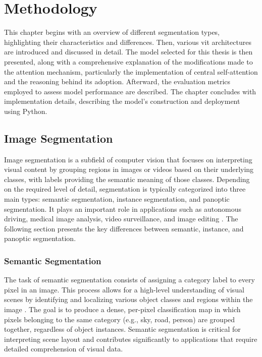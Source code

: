 \chapter{Methodology}
This chapter begins with an overview of different segmentation types, highlighting their characteristics and differences. Then, various \acrfull{vit} architectures are introduced and discussed in detail. The model selected for this thesis is then presented, along with a comprehensive explanation of the modifications made to the attention mechanism, particularly the implementation of central self-attention and the reasoning behind its adoption. Afterward, the evaluation metrics employed to assess model performance are described. The chapter concludes with implementation details, describing the model's construction and deployment using Python.


\section{Image Segmentation}
Image segmentation is a subfield of computer vision that focuses on interpreting visual content by grouping regions in images or videos based on their underlying classes, with labels providing the semantic meaning of those classes. Depending on the required level of detail, segmentation is typically categorized into three main types: semantic segmentation, instance segmentation, and panoptic segmentation. It plays an important role in applications such as autonomous driving, medical image analysis, video surveillance, and image editing \cite{zhou2024imagesegmentationfoundationmodel}. The following section presents the key differences between semantic, instance, and panoptic segmentation.


\subsection{Semantic Segmentation}
The task of semantic segmentation consists of assigning a category label to every pixel in an image. This process allows for a high-level understanding of visual scenes by identifying and localizing various object classes and regions within the image \cite{zhou2018semanticunderstandingscenesade20k}. The goal is to produce a dense, per-pixel classification map in which pixels belonging to the same category (e.g., sky, road, person) are grouped together, regardless of object instances. Semantic segmentation is critical for interpreting scene layout and contributes significantly to applications that require detailed comprehension of visual data.


